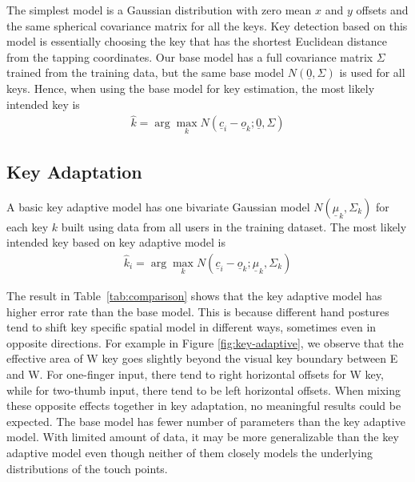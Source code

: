\documentclass{sigchi}
\begin{document}
The simplest model is a Gaussian distribution with zero mean $x$ and $y$
 offsets and the same spherical covariance matrix for all the keys. Key
detection based on this model is essentially choosing the key that has the shortest Euclidean distance from the tapping coordinates. 
Our base model has a full covariance matrix $\Sigma$ trained from the
training data, but the same base model $N(\underline 0, \Sigma)$ is used for all keys. Hence, when using the base model for key estimation, the most likely intended key is
\begin{align}          
\hat k = \arg\max_k N(\underline c_i - \underline o_k; \underline 0, \Sigma)
\end{align}


\subsection{Key Adaptation}
A basic key adaptive model has one bivariate Gaussian model
$N(\underline\mu_k, \Sigma_k)$ for each key $k$ built  using data from all users in the training dataset. The most likely intended key based on key adaptive model is
\begin{align}          
\hat k_i = \arg\max_k N(\underline c_i - \underline o_k; \underline \mu_k, \Sigma_k)
\end{align}

The result in Table~\ref{tab:comparison} shows that the key adaptive 
model has higher error rate than the base model. This is because different hand
postures tend to shift key specific spatial model in different ways, sometimes even in opposite
directions. For example in Figure \ref{fig:key-adaptive}, we observe that the
effective area of W key goes slightly beyond the visual key boundary between E 
and W. For one-finger input, there tend to right horizontal offsets for W key, 
while for two-thumb input, there tend to be left horizontal offsets. When mixing
these opposite effects together in key adaptation, no meaningful results could
be expected. The base model has fewer number of
parameters than the key adaptive model. With limited amount of data, it
may be more generalizable than the key adaptive model even though neither
of them closely models the underlying distributions of the touch points.
\end{document}
